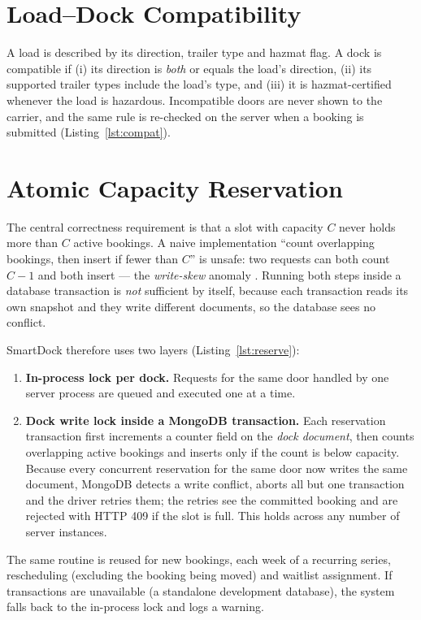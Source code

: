\section{Load--Dock Compatibility}
A load is described by its direction, trailer type and hazmat flag. A dock is compatible if (i) its direction is \emph{both} or equals the load's direction, (ii) its supported trailer types include the load's type, and (iii) it is hazmat-certified whenever the load is hazardous. Incompatible doors are never shown to the carrier, and the same rule is re-checked on the server when a booking is submitted (Listing~\ref{lst:compat}).

\section{Atomic Capacity Reservation}
The central correctness requirement is that a slot with capacity $C$ never holds more than $C$ active bookings. A naive implementation ``count overlapping bookings, then insert if fewer than $C$'' is unsafe: two requests can both count $C-1$ and both insert --- the \emph{write-skew} anomaly \cite{kleppmann2017}. Running both steps inside a database transaction is \emph{not} sufficient by itself, because each transaction reads its own snapshot and they write different documents, so the database sees no conflict.

SmartDock therefore uses two layers (Listing~\ref{lst:reserve}):
\begin{enumerate}
  \item \textbf{In-process lock per dock.} Requests for the same door handled by one server process are queued and executed one at a time.
  \item \textbf{Dock write lock inside a MongoDB transaction.} Each reservation transaction first increments a counter field on the \emph{dock document}, then counts overlapping active bookings and inserts only if the count is below capacity. Because every concurrent reservation for the same door now writes the same document, MongoDB detects a write conflict, aborts all but one transaction and the driver retries them; the retries see the committed booking and are rejected with HTTP 409 if the slot is full. This holds across any number of server instances.
\end{enumerate}
The same routine is reused for new bookings, each week of a recurring series, rescheduling (excluding the booking being moved) and waitlist assignment. If transactions are unavailable (a standalone development database), the system falls back to the in-process lock and logs a warning.

